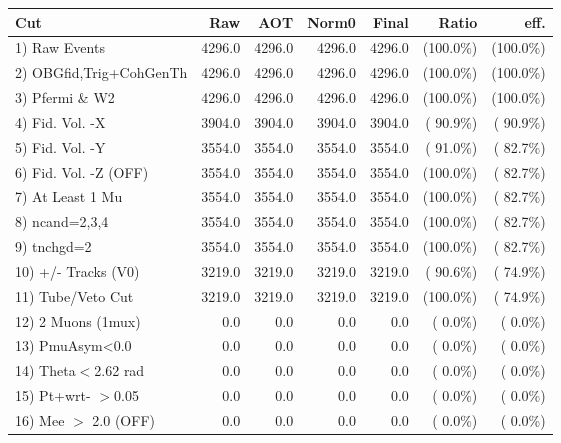 \begin{table}[h!]\centering
 \begin{tabular}{||l||r|r|r|r|r|r||}
 \hline
 \hline
 Cut & Raw & AOT & Norm0 & Final & Ratio & eff.       \\
 \hline
  1) Raw Events           &       4296.0 &       4296.0 &       4296.0 &       4296.0 & (100.0\%) & (100.0\%) \\
  2) OBGfid,Trig+CohGenTh &       4296.0 &       4296.0 &       4296.0 &       4296.0 & (100.0\%) & (100.0\%) \\
  3) Pfermi \& W2         &       4296.0 &       4296.0 &       4296.0 &       4296.0 & (100.0\%) & (100.0\%) \\
  4) Fid. Vol. -X         &       3904.0 &       3904.0 &       3904.0 &       3904.0 & ( 90.9\%) & ( 90.9\%) \\
  5) Fid. Vol. -Y         &       3554.0 &       3554.0 &       3554.0 &       3554.0 & ( 91.0\%) & ( 82.7\%) \\
  6) Fid. Vol. -Z (OFF)   &       3554.0 &       3554.0 &       3554.0 &       3554.0 & (100.0\%) & ( 82.7\%) \\
  7) At Least 1 Mu        &       3554.0 &       3554.0 &       3554.0 &       3554.0 & (100.0\%) & ( 82.7\%) \\
  8) ncand=2,3,4          &       3554.0 &       3554.0 &       3554.0 &       3554.0 & (100.0\%) & ( 82.7\%) \\
  9) tnchgd=2             &       3554.0 &       3554.0 &       3554.0 &       3554.0 & (100.0\%) & ( 82.7\%) \\
 10) +/- Tracks (V0)      &       3219.0 &       3219.0 &       3219.0 &       3219.0 & ( 90.6\%) & ( 74.9\%) \\
 11) Tube/Veto Cut        &       3219.0 &       3219.0 &       3219.0 &       3219.0 & (100.0\%) & ( 74.9\%) \\
 12) 2 Muons (1mux)       &          0.0 &          0.0 &          0.0 &          0.0 & (  0.0\%) & (  0.0\%) \\
 13) PmuAsym<0.0          &          0.0 &          0.0 &          0.0 &          0.0 & (  0.0\%) & (  0.0\%) \\
 14) Theta$<$2.62 rad     &          0.0 &          0.0 &          0.0 &          0.0 & (  0.0\%) & (  0.0\%) \\
 15) Pt+wrt- $>$0.05      &          0.0 &          0.0 &          0.0 &          0.0 & (  0.0\%) & (  0.0\%) \\
 16) Mee $>$ 2.0  (OFF)   &          0.0 &          0.0 &          0.0 &          0.0 & (  0.0\%) & (  0.0\%) \\

\end{tabular}
\end{table}

